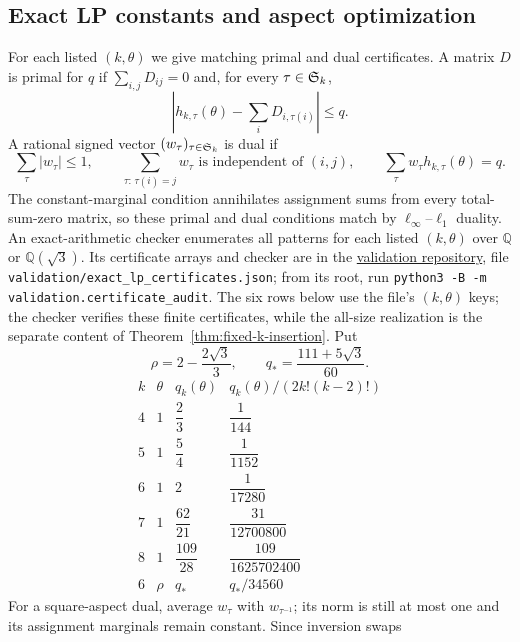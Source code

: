\subsection{Exact LP constants and aspect optimization}
For each listed $(k,\theta)$ we give matching primal and dual certificates.  A
matrix $D$ is primal for $q$ if $\sum_{i,j}D_{ij}=0$ and, for every
$\tau\in\mathfrak S_k$,
\[
 \left|h_{k,\tau}(\theta)-\sum_iD_{i,\tau(i)}\right|\le q.
\]
A rational signed vector $(w_\tau)_{\tau\in\mathfrak S_k}$ is dual if
\[
 \sum_{\tau}|w_\tau|\le1,\qquad
 \sum_{\tau:\,\tau(i)=j}w_\tau
 \text{ is independent of }(i,j),
 \qquad
 \sum_{\tau}w_\tau h_{k,\tau}(\theta)=q.
\]
The constant-marginal condition annihilates assignment sums from every
total-sum-zero matrix, so these primal and dual conditions match by
$\ell_\infty$--$\ell_1$ duality.  An exact-arithmetic checker enumerates all
patterns for each listed $(k,\theta)$ over $\mathbb Q$ or $\mathbb Q(\sqrt3)$.
Its certificate arrays and checker are in the
\href{https://github.com/AutoclickerI/near-balanced-permutations/tree/v1.1.0}{validation repository},
file \texttt{validation/exact\_lp\_certificates.json}; from its root, run
\texttt{python3 -B -m validation.certificate\_audit}.  The six rows below
use the file's $(k,\theta)$ keys; the checker verifies these finite
certificates, while the all-size realization is the separate content of
Theorem~\ref{thm:fixed-k-insertion}.  Put
\begin{equation}\label{eq:k6-aspect-optimum}
 \rho=2-\frac{2\sqrt3}{3},\qquad q_*=\frac{111+5\sqrt3}{60}.
\end{equation}
\begingroup
\renewcommand{\arraystretch}{2}
\begin{equation}\label{eq:fixed-k-optima}
\begin{array}{c|c|c|c}
 k&\theta&q_k(\theta)&q_k(\theta)/(2k!(k-2)!)\\ \hline
 4&1&\dfrac{2}{3}&\dfrac{1}{144}\\
 5&1&\dfrac{5}{4}&\dfrac{1}{1152}\\
 6&1&2&\dfrac{1}{17280}\\
 7&1&\dfrac{62}{21}&\dfrac{31}{12700800}\\
 8&1&\dfrac{109}{28}&\dfrac{109}{1625702400}\\
 6&\rho&q_*&q_*/34560
\end{array}
\end{equation}
\endgroup
For a square-aspect dual, average $w_\tau$ with $w_{\tau^{-1}}$; its norm
is still at most one and its assignment marginals remain constant.  Since inversion swaps
